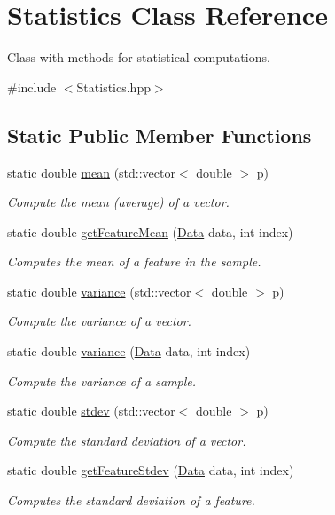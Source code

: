 \hypertarget{class_statistics}{}\section{Statistics Class Reference}
\label{class_statistics}


Class with methods for statistical computations.  




{\ttfamily \#include $<$Statistics.\+hpp$>$}

\subsection*{Static Public Member Functions}
\begin{DoxyCompactItemize}
\item 
static double \hyperlink{class_statistics_ab121520f7556f75e295e04ff71f2af39}{mean} (std\+::vector$<$ double $>$ p)
\begin{DoxyCompactList}\small\item\em Compute the mean (average) of a vector. \end{DoxyCompactList}\item 
static double \hyperlink{class_statistics_a4201ed0f3f817591bcf18d8ba7bfc1e0}{get\+Feature\+Mean} (\hyperlink{class_data}{Data} data, int index)
\begin{DoxyCompactList}\small\item\em Computes the mean of a feature in the sample. \end{DoxyCompactList}\item 
static double \hyperlink{class_statistics_af3a74e0ab944341356b8afeb9fc0ecbd}{variance} (std\+::vector$<$ double $>$ p)
\begin{DoxyCompactList}\small\item\em Compute the variance of a vector. \end{DoxyCompactList}\item 
static double \hyperlink{class_statistics_a0390754b117a9b7a637b44992ed2ebf6}{variance} (\hyperlink{class_data}{Data} data, int index)
\begin{DoxyCompactList}\small\item\em Compute the variance of a sample. \end{DoxyCompactList}\item 
static double \hyperlink{class_statistics_a75435245095cd0fd54b2d57a6ae592da}{stdev} (std\+::vector$<$ double $>$ p)
\begin{DoxyCompactList}\small\item\em Compute the standard deviation of a vector. \end{DoxyCompactList}\item 
static double \hyperlink{class_statistics_a4cd8cbff1c0b3cdf08adf6c7fc453251}{get\+Feature\+Stdev} (\hyperlink{class_data}{Data} data, int index)
\begin{DoxyCompactList}\small\item\em Computes the standard deviation of a feature. \end{DoxyCompactList}\end{DoxyCompactItemize}
